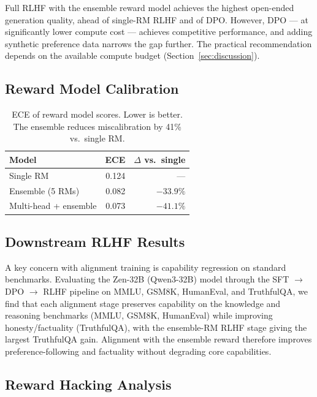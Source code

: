\documentclass[11pt,a4paper]{article}
\begin{document}
Full RLHF with the ensemble reward model achieves the highest open-ended generation
quality, ahead of single-RM RLHF and of DPO. However, DPO — at significantly lower
compute cost — achieves competitive performance, and adding synthetic preference data
narrows the gap further. The practical recommendation depends on the available compute
budget (Section~\ref{sec:discussion}).

\subsection{Reward Model Calibration}

\begin{table}[H]
\centering
\caption{ECE of reward model scores. Lower is better. The ensemble reduces
miscalibration by 41\% vs.\ single RM.}
\begin{tabular}{lrr}
\toprule
\textbf{Model} & \textbf{ECE} & \textbf{$\Delta$ vs.\ single} \\
\midrule
Single RM                & 0.124 & --- \\
Ensemble (5 RMs)         & 0.082 & $-33.9\%$ \\
Multi-head + ensemble    & 0.073 & $-41.1\%$ \\
\bottomrule
\end{tabular}
\label{tab:calibration}
\end{table}

\subsection{Downstream RLHF Results}

A key concern with alignment training is capability regression on standard benchmarks.
Evaluating the Zen-32B (Qwen3-32B) model through the SFT $\to$ DPO $\to$ RLHF pipeline on
MMLU, GSM8K, HumanEval, and TruthfulQA, we find that each alignment stage preserves
capability on the knowledge and reasoning benchmarks (MMLU, GSM8K, HumanEval) while
improving honesty/factuality (TruthfulQA), with the ensemble-RM RLHF stage giving the
largest TruthfulQA gain. Alignment with the ensemble reward therefore improves
preference-following and factuality without degrading core capabilities.

\subsection{Reward Hacking Analysis}
\end{document}
